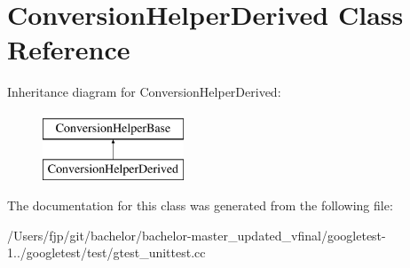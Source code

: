 \hypertarget{class_conversion_helper_derived}{}\section{Conversion\+Helper\+Derived Class Reference}
\label{class_conversion_helper_derived}
Inheritance diagram for Conversion\+Helper\+Derived\+:\begin{figure}[H]
\begin{center}
\leavevmode
\includegraphics[height=2.000000cm]{class_conversion_helper_derived}
\end{center}
\end{figure}


The documentation for this class was generated from the following file\+:\begin{DoxyCompactItemize}
\item 
/\+Users/fjp/git/bachelor/bachelor-\/master\+\_\+updated\+\_\+vfinal/googletest-\/1../googletest/test/gtest\+\_\+unittest.\+cc\end{DoxyCompactItemize}
